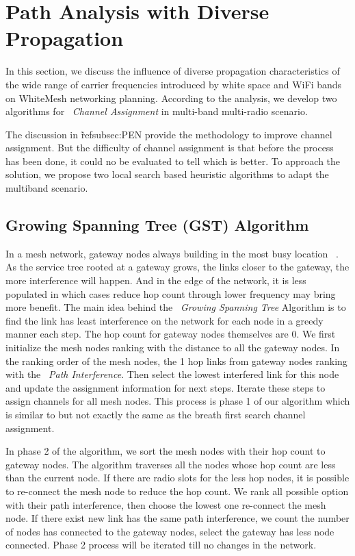 \section{Path Analysis with Diverse Propagation}
\label{sec:wmalgorithms}


In this section, we discuss the influence of diverse propagation
characteristics of the wide range of carrier frequencies introduced
by white space and WiFi bands on WhiteMesh networking planning.
According to the analysis, we develop two algorithms for ~\emph{Channel Assignment} in multi-band multi-radio scenario.




The discussion in \~ref{subsec:PEN} provide the methodology to improve channel assignment. But the difficulty of channel assignment is that before the process has been done, it could no be evaluated to tell which is better.
To approach the solution, we propose two local search based heuristic algorithms to adapt the multiband scenario. 


\subsection{Growing Spanning Tree (GST) Algorithm}
In a mesh network, gateway nodes always building in the most busy location ~\cite{robinson2008adding, he2008optimizing}.
As the service tree rooted at a gateway grows, the links closer to the gateway, the more interference will happen.
And in the edge of the network, it is less populated in which cases reduce hop count through lower frequency may bring more benefit. 
The main idea behind the ~\emph{Growing Spanning Tree} Algorithm is 
to find the link has least interference on the network for each node in a greedy manner each step. The hop count for gateway nodes themselves are 0.
We first initialize the mesh nodes ranking with the distance to all the gateway nodes. In the ranking order of the mesh nodes, the 1 hop links from gateway nodes ranking with the ~\emph{Path Interference}. Then select the lowest interfered link for this node and update the assignment information for next steps. 
Iterate these steps to assign channels for all mesh nodes. This process is phase 1 of our algorithm which is similar to but not exactly the same as the breath first search channel assignment. 

In phase 2 of the algorithm, we sort the mesh nodes with their hop count to gateway nodes. 
The algorithm traverses all the nodes whose hop count are less than the current node. If there are radio slots for the less hop nodes, it is possible to re-connect the mesh node to reduce the hop count. We rank all possible option with their path interference, then choose the lowest one re-connect the mesh node. If there exist new link has the same path interference, we count the number of nodes has connected to the gateway nodes, select the gateway has less node connected. Phase 2 process will be iterated till no changes in the network.

